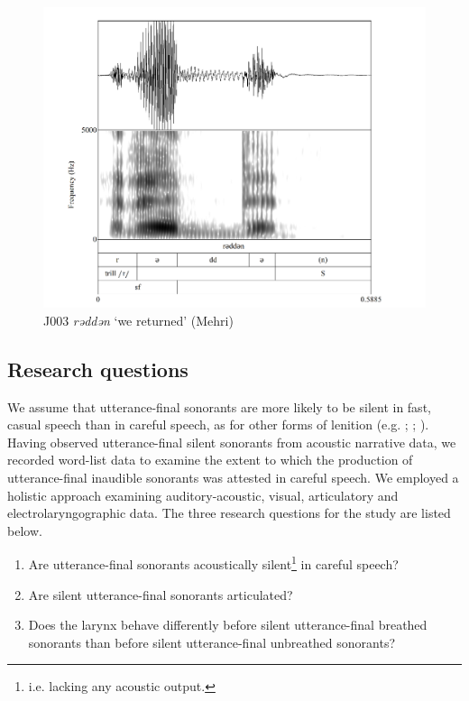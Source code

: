 \documentclass[output=paper]{langscibook}
\begin{document}
\begin{figure}[p]
\includegraphics[height=.4\textheight]{figures/a12Watsonetal-img006.png}
\caption{
 \label{fig:watson:6} J003 \textit{rəddən} ‘we returned’ (Mehri)}
\end{figure}


\clearpage
\subsection{Research questions}
\label{sec:watson:3.2}
{We assume that utterance-final sonorants are more likely to be silent in fast, casual speech than in careful speech, as for other forms of lenition (e.g. \citealt{Kirchner1998,Kirchner2001}; \citealt{Warner2011}; \citealt{Melero-Garcia2021}). Having observed utterance-final silent sonorants from acoustic narrative data, we recorded word-list data to examine the extent to which the production of utterance-final inaudible sonorants was attested in careful speech. We employed a holistic approach examining auditory-acoustic, visual, articulatory and electrolaryngographic data. The three research questions for the study are listed below.}

\begin{enumerate}
\item{Are utterance-final sonorants acoustically silent}\footnote{i.e. lacking any acoustic output.}{ in careful speech?}

\item{Are silent utterance-final sonorants articulated?}

\item{Does the larynx behave differently before silent utterance-final breathed sonorants than before silent utterance-final unbreathed sonorants?}
\end{enumerate}
\end{document}
